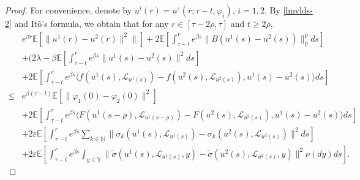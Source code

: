 \documentclass[11pt]{article}
\numberwithin{equation}{section}
\theoremstyle{plain}
\begin{document}
\begin{proof}
 For convenience, denote by 
        $u^{i}(r) = u^{\varepsilon}(r; \tau-t, \varphi_i)$, $i = 1,2$.
 By \eqref{lmvlds-2} and It\^{o}'s formula, 
 we obtain that for any $r \in [\tau-2\rho, \tau]$ and $t \ge 2\rho$,
 \begin{align}\label{sdsec-1}
       & e^{\beta r} \mathbb{E} \left[ \| u^1(r) - u^2(r) \|^2 \| \right]
          + 2 \mathbb{E} \left[ \int_{\tau-t}^{r} e^{\beta s}
                                 \|B(u^1(s) - u^2(s))\|_p^p ds \right] \nonumber\\
       & + (2 \lambda -\beta  \mathbb{E}
                     \left[ \int_{\tau-t}^{r} e^{\beta s} \|u^1(s) - u^2(s)\|^2 ds \right]  \nonumber\\
       & + 2 \mathbb{E}
              \left[ \int_{\tau-t}^{r} e^{\beta s}
                           \langle f(u^1(s), \mathcal{L}_{u^1(s) } ) - f(u^2(s), \mathcal{L}_{u^2(s) } ),
                                       u^1(s) - u^2(s)
                           \rangle ds
              \right]  \nonumber\\
  \le & e^{\beta(\tau-t)} \mathbb{E} \left[ \|  \varphi_1
  (0) - \varphi_2 (0) \|^2 \right]  \nonumber \\
       & + 2 \mathbb{E}
                   \left[ \int_{\tau-t}^{r} e^{\beta s}
                                 \langle F( u^1(s-\rho), \mathcal{L}_{u^1(s-\rho)}) - F(  u^2(s), \mathcal{L}_{u^2(s)}),
                                             u^1(s) - u^2(s)
                                 \rangle ds
                   \right]  \nonumber\\
       & + 2 \varepsilon \mathbb{E}
                  \left[ \int_{\tau-t}^{r} e^{\beta s}
                              \sum_{k \in \mathbb{N} }
                                     \|\sigma_k(u^1(s), \mathcal{L}_{u^1(s)}) -  \sigma_k(u^2(s), \mathcal{L}_{u^2(s)}) \|^2 ds
                  \right]  \nonumber\\
       & + 2 \varepsilon \mathbb{E}
                      \left[ \int_{\tau-t}^{r} e^{\beta s}
                                   \int_{ y \in \mathbb{Y} }
                                          \| \widetilde{\sigma}(u^1(s),  \mathcal{L}_{u^1(s)},y)
                                             - \widetilde{\sigma}(u^2(s), \mathcal{L}_{u^2(s)},y) 
                                           \|^2 \nu(dy) ds
                      \right].
 \end{align}



\end{proof}
\end{document}
